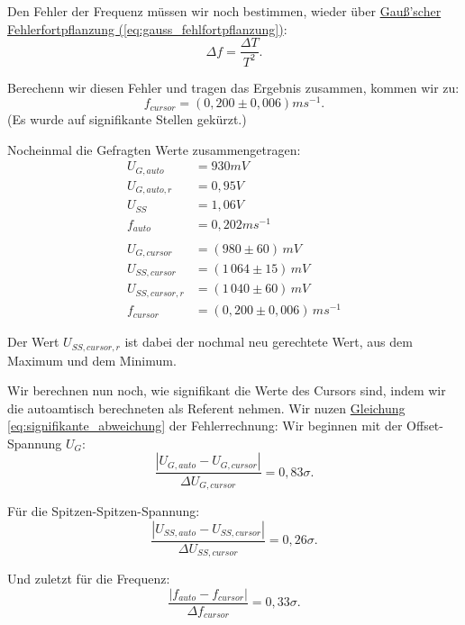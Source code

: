 Den Fehler der Frequenz müssen wir noch bestimmen, wieder über \hyperref[eq:gauss_fehlfortpflanzung]{Gauß'scher Fehlerfortpflanzung (\ref*{eq:gauss_fehlfortpflanzung})}:
\begin{equation}
    \Delta f = \frac{\Delta T}{T^2}.
    \label{eq:f_freq}
\end{equation}

Berechenn wir diesen Fehler und tragen das Ergebnis zusammen, kommen wir zu: 
\begin{equation}
    \boxed{
        f_{cursor} = (0,200 \pm 0,006) ms^{-1}
    }.
\end{equation}
(Es wurde auf signifikante Stellen gekürzt.)


Nocheinmal die Gefragten Werte zusammengetragen:
\begin{align*}
    U_{G,auto} &= 930 mV \\
    U_{G,auto,r} &= 0,95 V \\
    U_{SS} &= 1,06 V \\
    f_{auto} &= 0,202 ms^{-1} \\
    \\
    U_{G,cursor}& = (980 \pm 60)\, mV \\
    U_{SS,cursor} &= (1\,064 \pm 15)\, mV \\
    U_{SS,cursor,r} &= (1\,040 \pm 60)\, mV \\
    f_{cursor} &= (0,200 \pm 0,006)\, ms^{-1}
\end{align*}

Der Wert $U_{SS,cursor,r}$ ist dabei der nochmal neu gerechtete Wert, aus dem Maximum und dem Minimum. 

Wir berechnen nun noch, wie signifikant die Werte des Cursors sind, indem wir die autoamtisch berechneten als Referent nehmen. Wir nuzen \hyperref[eq:signifikante_abweichung]{Gleichung \ref*{eq:signifikante_abweichung}} der Fehlerrechnung:
Wir beginnen mit der Offset-Spannung $U_G$:
\begin{equation}
    \frac{\left| U_{G,auto} - U_{G,cursor} \right|}{\Delta U_{G,cursor}} = 0,83\sigma.
\end{equation}

Für die Spitzen-Spitzen-Spannung:
\begin{equation}
    \frac{\left| U_{SS,auto} - U_{SS,cursor} \right|}{\Delta U_{SS,cursor}} = 0,26\sigma.
\end{equation}

Und zuletzt für die Frequenz:
\begin{equation}
    \frac{\left| f_{auto} - f_{cursor} \right|}{\Delta f_{cursor}} = 0,33\sigma.
\end{equation}


